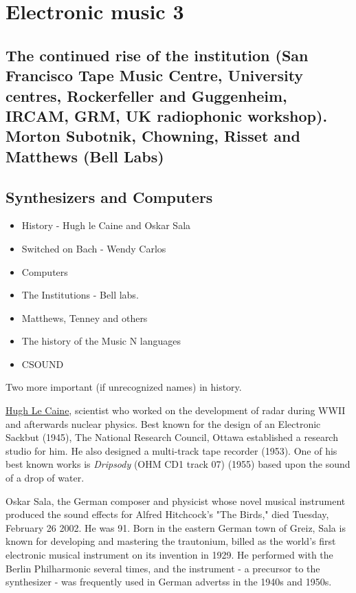 
\chapter{Electronic music 3}
\label{history3}


\section{The continued rise of the institution (San Francisco Tape Music Centre, University centres, Rockerfeller and Guggenheim, IRCAM, GRM, UK radiophonic workshop). Morton Subotnik, Chowning, Risset and Matthews (Bell Labs)}

\section{Synthesizers and Computers}
\begin{itemize}
\item History - Hugh le Caine and Oskar Sala
\item Switched on Bach - Wendy Carlos
\item Computers
\item The Institutions - Bell labs.
\item Matthews, Tenney and others
\item The history of the Music N languages
\item CSOUND
\end{itemize}

Two more important (if unrecognized names) in history.

\href{http://www.hughlecaine.com}{Hugh Le Caine}, scientist who worked on the development of radar during WWII and afterwards nuclear physics. Best known for the design of an Electronic Sackbut (1945), The National Research Council, Ottawa established a research studio for him. He also designed a multi-track tape recorder (1953). One of his best known works is \textit{Dripsody} (OHM CD1 track 07) (1955) based upon the sound of a drop of water.

Oskar Sala, the German composer and physicist whose novel musical instrument produced the sound effects for Alfred Hitchcock's "The Birds," died Tuesday, February 26 2002. He was 91. Born in the eastern German town of Greiz, Sala is known for developing and mastering the trautonium, billed as the world's first electronic musical instrument on its invention in 1929. He performed with the Berlin Philharmonic several times, and the instrument - a precursor to the synthesizer - was frequently used in German advertss in the 1940s and 1950s.

